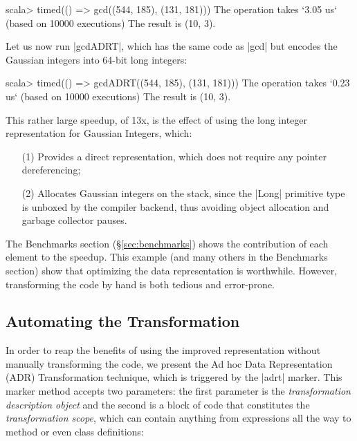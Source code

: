 \begin{lstlisting-nobreak}
scala> timed(() => gcd((544, 185), (131, 181)))
The operation takes `3.05 us` (based on 10000 executions)
The result is (10, 3).
\end{lstlisting-nobreak}

Let us now run |gcdADRT|, which has the same code as |gcd| but encodes the Gaussian integers into 64-bit long integers:

\begin{lstlisting-nobreak}
scala> timed(() => gcdADRT((544, 185), (131, 181)))
The operation takes `0.23 us` (based on 10000 executions)
The result is (10, 3).
\end{lstlisting-nobreak}

This rather large speedup, of 13x, is the effect of using the long integer representation for Gaussian Integers, which:

\vspace{0.25em}
\begin{itemize}
  \item[(1)] Provides a direct representation, which does not require any pointer dereferencing;
  \item[(2)] Allocates Gaussian integers on the stack, since the |Long| primitive type is unboxed by the compiler backend, thus avoiding object allocation and garbage collector pauses.
\end{itemize}
\vspace{0.25em}

The Benchmarks section (\S\ref{sec:benchmarks}) shows the contribution of each element to the speedup. This example (and many others in the Benchmarks section) show that optimizing the data representation is worthwhile. However, transforming the code by hand is both tedious and error-prone. %

\vspace{-0.6em}

\subsection{Automating the Transformation}
\label{sec:automating}

\vspace{-0.2em}

In order to reap the benefits of using the improved representation without manually transforming the code, we present the Ad hoc Data Representation (ADR) Transformation technique, which is triggered by the |adrt| marker. This marker method accepts two parameters: the first parameter is the \emph{transformation description object} and the second is a block of code that constitutes the \emph{transformation scope}, which can contain anything from expressions all the way to method or even class definitions:

